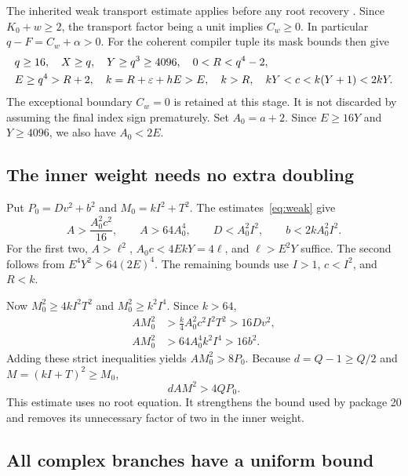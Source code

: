 \documentclass[11pt,a4paper]{article}
\theoremstyle{remark}\newtheorem{remark}[theorem]{Remark}
\begin{document}
The inherited weak transport estimate applies before any root recovery
\cite{blank67}. Since $K_0+w\ge2$, the transport factor being a unit
implies $C_w\ge0$. In particular $q-F=C_w+\alpha>0$.
For the coherent compiler tuple its mask bounds then give
\begin{align}
 &q\ge16,\quad X\ge q,\quad Y\ge q^3\ge4096,
 \quad 0<R<q^4-2,\notag\\
 &E\ge q^4>R+2,\quad k=R+\varepsilon+hE>E,\quad k>R,
 \quad kY<c<k(Y+1)<2kY.\label{eq:weak}
\end{align}
The exceptional boundary $C_w=0$ is retained at this stage. It is not
discarded by assuming the final index sign prematurely. Set $A_0=a+2$.
Since $E\ge16Y$ and $Y\ge4096$, we also have $A_0<2E$.

\subsection{The inner weight needs no extra doubling}

Put $P_0=Dv^2+b^2$ and $M_0=kI^2+T^2$.
The estimates~\eqref{eq:weak} give
\begin{equation}
 A>\frac{A_0^2c^2}{16},\qquad A>64A_0^4,\qquad
 D<A_0^2I^2,\qquad b<2kA_0^2I^2.
 \label{eq:innerbounds}
\end{equation}
For the first two, $A>\ell^2$, $A_0c<4EkY=4\ell$, and
$\ell>E^2Y$ suffice. The second follows from
$E^4Y^2>64(2E)^4$. The remaining bounds use $I>1$, $c<I^2$, and $R<k$.

Now $M_0^2\ge4kI^2T^2$ and $M_0^2\ge k^2I^4$. Since $k>64$,
\begin{align*}
 AM_0^2&>\frac{k}{4}A_0^2c^2I^2T^2>16Dv^2,\\
 AM_0^2&>64A_0^4k^2I^4>16b^2.
\end{align*}
Adding these strict inequalities yields $AM_0^2>8P_0$.
Because $d=Q-1\ge Q/2$ and $M=(kI+T)^2\ge M_0$,
\begin{equation}
 \boxed{dAM^2>4QP_0.}\label{eq:inner}
\end{equation}
This estimate uses no root equation. It strengthens the bound used by
package 20 and removes its unnecessary factor of two in the inner weight.

\subsection{All complex branches have a uniform bound}
\end{document}
